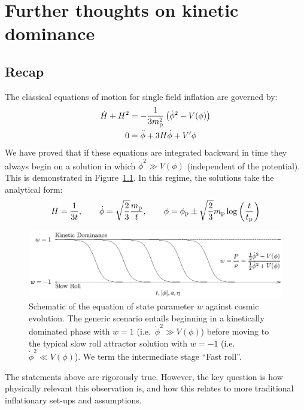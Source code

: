 \chapter{Further thoughts on kinetic dominance}
\label{chap:cls}

\section{Recap}
The classical equations of motion for single field inflation are
governed by:
%
\begin{align}
  \dot{H} + H^2 
  &= - \frac{1}{3m_{\mathrm{p}}^2}\left( \dot{\phi}^2 - V(\phi)\right)
  \label{eqn:raychaudhuri}
  \\
  0 &= \ddot{\phi} + 3H\dot\phi + V^\prime{\phi}
  \label{eqn:kleingordon}
\end{align}
%
We have proved that if these equations are integrated backward in time
they always begin on a solution in which $\dot\phi^2\gg V(\phi)$
(independent of the potential). This is demonstrated in
Figure~\ref{fig:w}. In this regime, the solutions take the analytical
form:
\begin{equation}
  H = \frac{1}{3t},\qquad \dot{\phi} 
  = \sqrt{\frac 2 3}\frac{m_{\mathrm{p}}}{t}, \qquad \phi 
  = \phi_{\mathrm{p}} \pm \sqrt{\frac 2 3}m_{\mathrm{p}} \log\left( \frac t {t_{\mathrm{p}}} \right)
\end{equation}
\begin{figure}
  \includegraphics[width=\textwidth]{chapter_classical_perturbations/plots/w.eps}
  \caption{%
    Schematic of the equation of state parameter $w$ against cosmic
    evolution. The generic scenario entails beginning in a kinetically
    dominated phase with $w=1$ (i.e.\ $\dot{\phi}^2\gg V(\phi)$)
    before moving to the typical slow roll attractor solution with
    $w=-1$ (i.e.\ $\dot{\phi}^2 \ll V(\phi)$). We term the
    intermediate stage ``Fast roll''.\label{fig:w}
  }
\end{figure}

The statements above are rigorously true. However, the key question is how physically relevant this observation is, and how this relates to more traditional inflationary set-ups and assumptions.

